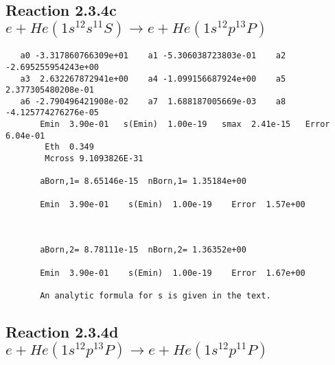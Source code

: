 \documentclass[12pt,dvipdfmx]{article}
\begin{document}
\newpage
\subsection{
Reaction 2.3.4c $e + He(1s^12s^11S) \rightarrow e + He(1s^12p^13P)$}

















\begin{small}\begin{verbatim}
   a0 -3.317860766309e+01    a1 -5.306038723803e-01    a2 -2.695255954243e+00
   a3  2.632267872941e+00    a4 -1.099156687924e+00    a5  2.377305480208e-01
   a6 -2.790496421908e-02    a7  1.688187005669e-03    a8 -4.125774276276e-05
       Emin  3.90e-01   s(Emin)  1.00e-19   smax  2.41e-15   Error  6.04e-01
        Eth  0.349
        Mcross 9.1093826E-31

       aBorn,1= 8.65146e-15  nBorn,1= 1.35184e+00

       Emin  3.90e-01    s(Emin)  1.00e-19    Error  1.57e+00



       aBorn,2= 8.78111e-15  nBorn,2= 1.36352e+00

       Emin  3.90e-01    s(Emin)  1.00e-19    Error  1.67e+00

       An analytic formula for s is given in the text.
\end{verbatim}\end{small}




\newpage
\subsection{
Reaction 2.3.4d $e + He(1s^12p^13P) \rightarrow e + He(1s^12p^11P)$}






\end{document}
